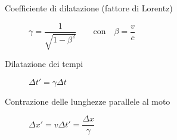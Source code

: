 \documentclass[a4paper,11pt,italian]{article}
\begin{document}
\begin{description}
%   
%   
%   
  
  \item[Coefficiente di dilatazione (fattore di Lorentz)]
  $ \gamma = \dfrac{1}{\sqrt{1-\beta^2}} \qquad \mathrm{con} \quad \beta = \dfrac{v}{c} $
%   
%
%   
  \item[Dilatazione dei tempi]
  $ \Delta t' = \gamma \Delta t $
%   
  
  \item[Contrazione delle lunghezze parallele al moto] 
  $ \Delta x' = v \Delta t' = \dfrac{\Delta x}{\gamma} $
  

\end{description}
\end{document}
